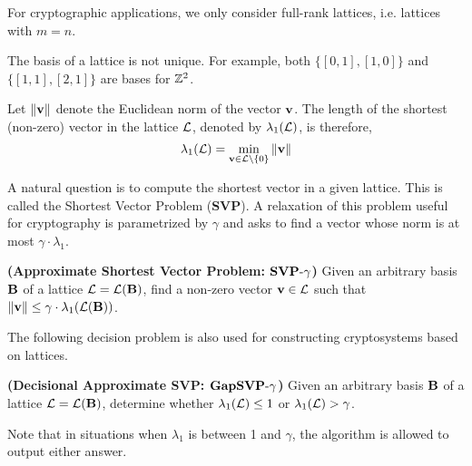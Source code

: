 \noindent For cryptographic applications, we only consider full-rank lattices, i.e. lattices with $m = n$.

\begin{remark}
The basis of a lattice is not unique. For example, both $ \{ [0,1],[1,0] \}$ and $\{[1,1], [2,1] \}$ are bases for ${{\mathbb Z}}^2$.
\end{remark}

\noindent Let $\|{{\bf v}}\|$ denote the Euclidean norm of the vector $\mathbf{v}$. The length of the shortest (non-zero) vector in the lattice $\mathcal{L}$, denoted by $\lambda_1(\mathcal{L})$, is therefore,
\[\lambda_1(\mathcal{L}) = \min_{\mathbf{v} \in \mathcal{L} \setminus \{0\}} \|\mathbf{v}\|
\]

\noindent A natural question is to compute the shortest vector in a given lattice. This is called the Shortest Vector Problem (\textbf{SVP}). A relaxation of this problem useful for cryptography is parametrized by $\gamma$ and asks to find a vector whose norm is at most $\gamma \cdot \lambda_1$.

\begin{problem} 
\textnormal{\textbf{(Approximate Shortest Vector Problem: $\textbf{SVP}\textnormal{-}\gamma$)}}
Given an arbitrary basis $\mathbf{B}$ of a lattice $\mathcal{L} = \mathcal{L}(\mathbf{B})$, find a non-zero vector $\mathbf{v} \in \mathcal{L}$ such that $\|\mathbf{v}\| \leq \gamma \cdot \lambda_1(\mathcal{L}(\mathbf{B}))$.
\end{problem}


\noindent The following decision problem is also used for constructing cryptosystems based on lattices.

\begin{problem}
\textnormal{\textbf{(Decisional Approximate SVP: $\textbf{GapSVP}\textnormal{-}\gamma$)}}
Given an arbitrary basis $\mathbf{B}$ of a lattice $\mathcal{L} = \mathcal{L}(\mathbf{B})$, determine whether $\lambda_1(\mathcal{L}) \leq 1$ or $\lambda_1(\mathcal{L}) > \gamma$. 

\noindent Note that in situations when $\lambda_1$ is between 1 and $\gamma$, the algorithm is allowed to output either answer. 
\end{problem}

